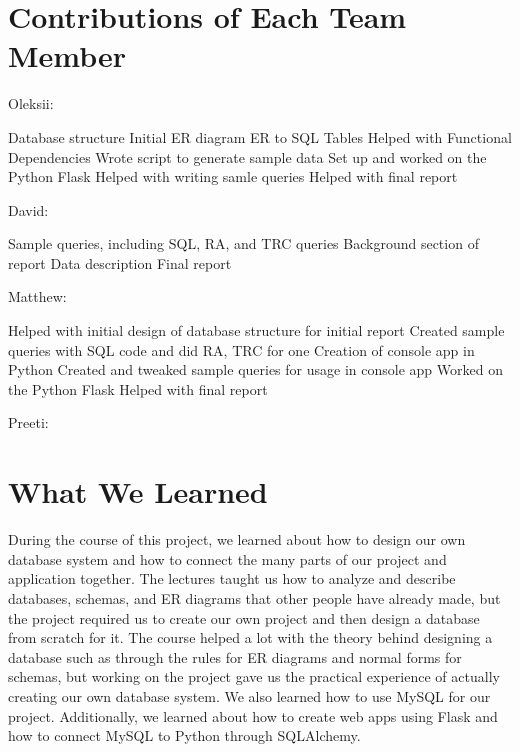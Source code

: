 \documentclass[12pt, oneside, a4paper]{article}
\begin{document}
    \section{Contributions of Each Team Member}
    Oleksii:
    \begin{outline}
        \1 Database structure
        \1 Initial ER diagram
        \1 ER to SQL Tables
        \1 Helped with Functional Dependencies
        \1 Wrote script to generate sample data
        \1 Set up and worked on the Python Flask
        \1 Helped with writing samle queries
        \1 Helped with final report
    \end{outline}
    David:
    \begin{outline}
        \1 Sample queries, including SQL, RA, and TRC queries
        \1 Background section of report
        \1 Data description
        \1 Final report
    \end{outline}
    Matthew:
    \begin{outline}
        \1 Helped with initial design of database structure for initial report
        \1 Created sample queries with SQL code and did RA, TRC for one
        \1 Creation of console app in Python
        \1 Created and tweaked sample queries for usage in console app
        \1 Worked on the Python Flask
        \1 Helped with final report
    \end{outline}
    Preeti:
    \section{What We Learned}
    During the course of this project, we learned about how to design our own database system and how to connect the many parts of our project and application together. The lectures taught us how to analyze and describe databases, schemas, and ER diagrams that other people have already made, but the project required us to create our own project and then design a database from scratch for it. The course helped a lot with the theory behind designing a database such as through the rules for ER diagrams and normal forms for schemas, but working on the project gave us the practical experience of actually creating our own database system. We also learned how to use MySQL for our project. Additionally, we learned about how to create web apps using Flask and how to connect MySQL to Python through SQLAlchemy.
\end{document}
